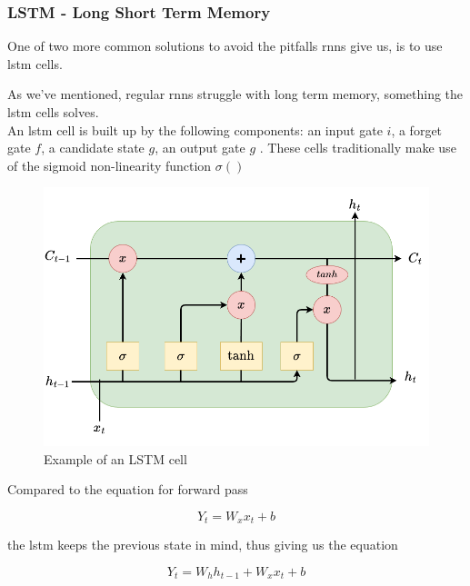 \subsubsection{LSTM - Long Short Term Memory}

One of two more common solutions to avoid the pitfalls \acrshort{rnn}s give us, is to use \acrshort{lstm} cells. 

 As we've mentioned, regular \acrshort{rnn}s struggle with long term memory, something the \acrshort{lstm} cells solves. \\ 


An \acrshort{lstm} cell is built up by the following components: an input gate $i$, a forget gate $f$, a candidate state $g$, an output gate $g$ .
These cells traditionally make use of the sigmoid non-linearity function $\sigma()$

\begin{figure}[h]
    \centering
    \includegraphics{figures/lstmcell.png}
    \caption[scale=0.4]{Example of an LSTM cell}
    \label{fig:lstmcell}
\end{figure}

Compared to the equation for forward pass 

\begin{equation} \label{eq:cnn}
    Y_t = W_xx_t + b
\end{equation}

the \acrshort{lstm} keeps the previous state in mind, thus giving us the equation


\begin{equation} \label{eq:lstm}
    Y_t = W_hh_{t-1} + W_xx_t + b
\end{equation}


